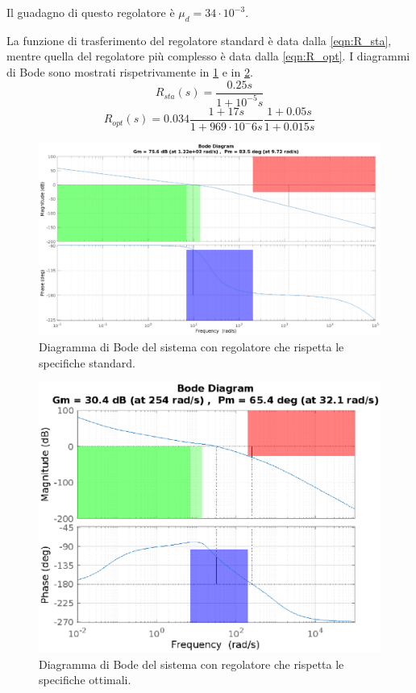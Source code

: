 \documentclass[a4paper]{article}
\begin{document}
Il guadagno di questo regolatore è $\mu_d = 34 \cdot 10^{-3}$.

La funzione di trasferimento del regolatore standard è data dalla \cref{eqn:R_sta}, mentre quella del regolatore più complesso è data dalla \cref{eqn:R_opt}.
I diagrammi di Bode sono mostrati rispetrivamente in \cref{fig:bode_L_sta} e in \cref{fig:bode_L}.
\begin{equation}
    \label{eqn:R_sta}
    R_{sta}(s) = \frac{ 0.25 s}{ 1+  10^{-5} s}
\end{equation}
\begin{equation}
    \label{eqn:R_opt}
    R_{opt}(s) = 0.034 \frac{1 + 17s}{1 + 969 \cdot 10^-6 s} \frac{1 + 0.05 s}{1 + 0.015 s}
\end{equation}

\begin{figure}[h!]
    \centering
    \includegraphics[width=\textwidth]{bode_L_sta}
    \caption{Diagramma di Bode del sistema con regolatore che rispetta le specifiche standard.}
    \label{fig:bode_L_sta}
\end{figure}

\begin{figure}[h!]
    \centering
    \includegraphics[width=\textwidth]{bode_L}
    \caption{Diagramma di Bode del sistema con regolatore che rispetta le specifiche ottimali.}
    \label{fig:bode_L}
\end{figure}
\end{document}
